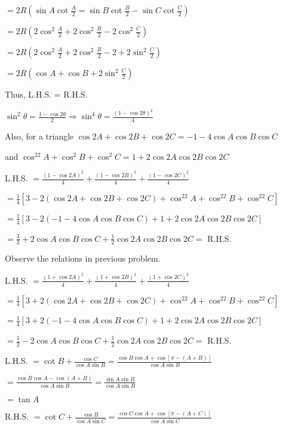   $= 2R\left(\sin A\cot\frac{A}{2} = \sin B\cot\frac{B}{2} - \sin C\cot\frac{C}{2}\right)$

  $= 2R\left(2\cos^2\frac{A}{2} + 2\cos^2\frac{B}{2} - 2\cos^2\frac{C}{2}\right)$

  $= 2R\left(2\cos^2\frac{A}{2} + 2\cos^2\frac{B}{2} - 2 + 2\sin^2\frac{C}{2}\right)$

  $= 2R\left(\cos A + \cos B + 2\sin^2\frac{C}{2}\right)$

  Thus, L.H.S. = R.H.S.

\item $\sin^2\theta = \frac{1 - \cos2\theta}{2} \Rightarrow \sin^4\theta = \frac{(1 - \cos2\theta)^2}{4}$

  Also, for a triangle $\cos 2A + \cos 2B + \cos 2C = -1 -4\cos A\cos B\cos C$

  and $\cos^22A + \cos^2B + \cos^2C = 1 + 2\cos 2A\cos 2B\cos 2C$

  L.H.S. $= \frac{(1 - \cos2A)^2}{4} + \frac{(1 - \cos2B)^2}{4} + \frac{(1 - \cos 2C)^2}{4}$

  $= \frac{1}{4}[3 - 2(\cos2A +\cos 2B + \cos 2C) + \cos^22A + \cos^22B + \cos^22C]$

  $= \frac{1}{4}[3 - 2(-1 - 4\cos A\cos B\cos C) + 1 + 2\cos 2A\cos 2B\cos 2C]$

  $= \frac{3}{2} + 2\cos A\cos B\cos C + \frac{1}{2}\cos 2A\cos 2B\cos 2C =$ R.H.S.

\item Observe the relations in previous problem.

  L.H.S. $= \frac{(1 + \cos2A)^2}{4} + \frac{(1 + \cos2B)^2}{4} + \frac{(1 + \cos2C)^2}{4}$

  $= \frac{1}{4}[3 + 2(\cos2A +\cos 2B + \cos 2C) + \cos^22A + \cos^22B + \cos^22C]$

  $= \frac{1}{4}[3 + 2(-1 - 4\cos A\cos B\cos C) + 1 + 2\cos 2A\cos 2B\cos 2C]$

  $= \frac{1}{2} - 2\cos A\cos B\cos C + \frac{1}{2}\cos2A\cos2B\cos2C =$ R.H.S.

\item L.H.S. $= \cot B + \frac{\cos C}{\cos A\sin B} = \frac{\cos B\cos A + \cos[\pi - (A + B)]}{\cos A\sin B}$

  $= \frac{\cos B\cos A - \cos(A + B)}{\cos A\sin B} = \frac{\sin A\sin B}{\cos A\sin B}$

  $= \tan A$

  R.H.S. $= \cot C + \frac{\cos B}{\cos A\sin C} = \frac{\cos C\cos A + \cos[\pi - (A + C)]}{\cos A\sin C}$

